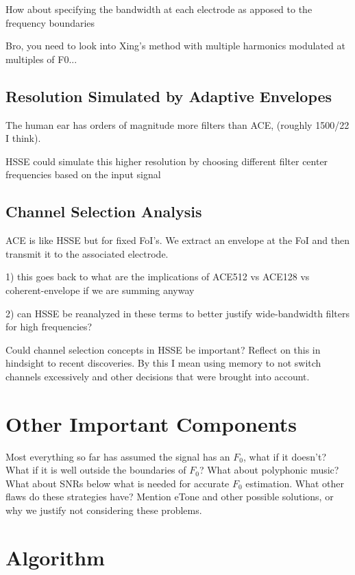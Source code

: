 \documentclass [11pt, proquest] {uwthesis}[2015/03/03]
\begin{document}
How about specifying the bandwidth at each electrode as apposed to the frequency boundaries

Bro, you need to look into Xing's method with multiple harmonics modulated at multiples of F0...


\subsection{Resolution Simulated by Adaptive Envelopes}

The human ear has orders of magnitude more filters than ACE, (roughly 1500/22 I think).

HSSE could simulate this higher resolution by choosing different filter center frequencies based on the input signal

\subsection{Channel Selection Analysis}

ACE is like HSSE but for fixed FoI's.  We extract an envelope at the FoI and then transmit it to the associated electrode.

1) this goes back to what are the implications of ACE512 vs ACE128 vs coherent-envelope if we are summing anyway

2) can HSSE be reanalyzed in these terms to better justify wide-bandwidth filters for high frequencies?

Could channel selection concepts in HSSE be important?  Reflect on this in hindsight to recent discoveries.  By this I mean using memory to not switch channels excessively and other decisions that were brought into account.

\section{Other Important Components}

Most everything so far has assumed the signal has an $F_0$, what if it doesn't?  What if it is well outside the boundaries of $F_0$?  What about polyphonic music?  What about SNRs below what is needed for accurate $F_0$ estimation.  What other flaws do these strategies have?  Mention eTone and other possible solutions, or why we justify not considering these problems.

\section{Algorithm}
\end{document}
